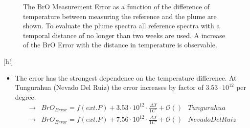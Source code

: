 \documentclass  [
  paper    = a4,
  BCOR     = 10mm,
  twoside,
  fontsize = 12pt,
  fleqn,
  toc      = bibnumbered,
  toc      = listofnumbered,
  numbers  = noendperiod,
  headings = normal,
  listof   = leveldown,
  version  = 3.03
]                                       {scrreprt}
\begin{document}
	\begin{figure}[h!]			
		\caption{The BrO Measurement Error as a function of the difference of temperature between measuring the reference and the plume are shown. To evaluate the plume spectra all reference spectra with a temporal distance of no longer than two weeks are used. A increase of the BrO Error with the distance in temperature is observable.}
		\label{fig:difftemp}
	\end{figure}[h!]
	\begin{itemize}
		\item The  error has the strongest dependence on the temperature difference. At Tungurahua (Nevado Del Ruiz) the  error increases by factor of $3.53\cdot10^{12}$  per degree.
		\begin{align*}
		\rightarrow&  BrO_{Error} = f(ext. P)+ 3.53\cdot10^{12}\cdot\frac{\Delta T}{1C^{\circ}} + \mathcal{O}\left(\right) & Tungurahua\\
		\rightarrow&  BrO_{Error} = f(ext. P)+7.56\cdot10^{12}\cdot\frac{\Delta T}{1C^{\circ}} + \mathcal{O}\left(\right) & Nevado Del Ruiz\\
		\end{align*}
	\end{itemize}
\end{document}
